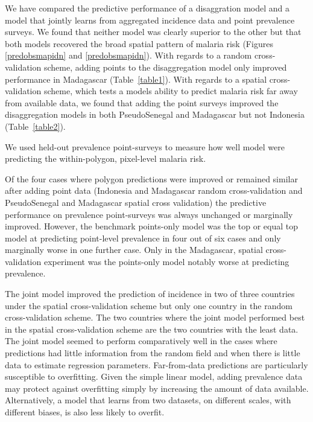 \documentclass[10pt,letterpaper]{article}
\begin{document}
We have compared the predictive performance of a disaggration model and a model that jointly learns from aggregated incidence data and point prevalence surveys.
We found that neither model was clearly superior to the other but that both models recovered the broad spatial pattern of malaria risk (Figures \ref{predobsmapidn} and \ref{predobsmapidn}).
With regards to a random cross-validation scheme, adding points to the disaggregation model only improved performance in  Madagascar (Table~\ref{table1}).
With regards to a spatial cross-validation scheme, which tests a models ability to predict malaria risk far away from available data, we found that adding the point surveys improved the disaggregation models in both PseudoSenegal and Madagascar but not Indonesia  (Table~\ref{table2}).


We used held-out prevalence point-surveys to measure how well model were predicting the within-polygon, pixel-level malaria risk.

Of the four cases where polygon predictions were improved or remained similar after adding point data (Indonesia and Madagascar random cross-validation and PseudoSenegal and Madagascar spatial cross validation) the predictive performance on prevalence point-surveys was always unchanged or marginally improved.
However, the benchmark points-only model was the top or equal top model at predicting point-level prevalence in four out of six cases and only marginally worse in one further case.
Only in the Madagascar, spatial cross-validation experiment was the points-only model notably worse at predicting prevalence.


The joint model improved the prediction of incidence in two of three countries under the spatial cross-validation scheme but only one country in the random cross-validation scheme.
The two countries where the joint model performed best in the spatial cross-validation scheme are the two countries with the least data.
The joint model seemed to perform comparatively well in the cases where predictions had little information from the random field and when there is little data to estimate regression parameters.
Far-from-data predictions are particularly susceptible to overfitting.
Given the simple linear model, adding prevalence data may protect against overfitting simply by increasing the amount of data available.
Alternatively, a model that learns from two datasets, on different scales, with different biases, is also less likely to overfit.
\end{document}
